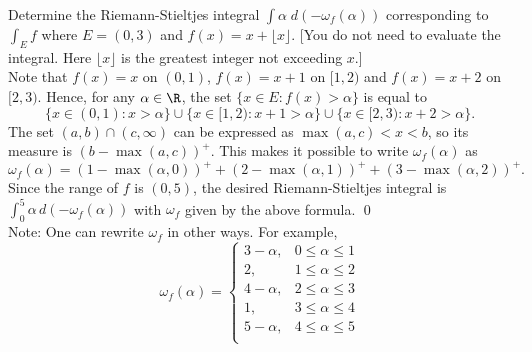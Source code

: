 \begin{hwsol}
Determine the Riemann-Stieltjes integral $\int \alpha \; d(-\omega_f(\alpha))$ corresponding to $\int_E f$ where $E= (0, 3)$ and $f(x)= x + \lfloor x \rfloor $. [You do not need to evaluate the integral. Here $\lfloor x \rfloor$ is the greatest integer not exceeding $x$.] \\

\pf Note that $f(x)=x$ on $(0, 1)$, $f(x)=x+1$ on $[1, 2)$ and $f(x)=x+2$ on $[2, 3)$. Hence, for any $\alpha \in \R$, the set $\{ x \in E \colon f(x) > \alpha \}$ is equal to
        \[
        \{ x \in (0, 1) \colon x > \alpha \} \cup \{ x \in [1, 2) \colon x+1 > \alpha \} \cup \{ x \in [2, 3) \colon x+2 > \alpha \}.
        \]
The set $(a, b) \cap (c,\infty)$ can be expressed as $\max(a, c) < x < b$, so its measure is $(b - \max(a, c))^+$. This makes it possible to write $\omega_f(\alpha)$ as
        \[ 
        \omega_f(\alpha)= (1 - \max(\alpha, 0))^+ + (2 - \max(\alpha, 1))^+ + (3 - \max(\alpha, 2))^+.
        \]
Since the range of $f$ is $(0, 5)$, the desired Riemann-Stieltjes integral is  $\int_0^5  \alpha\,d(-\omega_f(\alpha))$ with $\omega_f$ given by the above formula. \qed \\
 
\noindent Note: One can rewrite $\omega_f$ in other ways. For example,
        \[
        \omega_f(\alpha) = 
        \begin{cases}
        3 - \alpha, & 0 \leq \alpha \leq 1 \\ 
        2, & 1 \leq \alpha \leq 2 \\ 
        4 - \alpha, & 2 \leq \alpha \leq 3 \\ 
        1, & 3 \leq \alpha \leq 4 \\ 
        5 - \alpha, & 4 \leq \alpha \leq 5  \\ 
        \end{cases}
        \] \\
\end{hwsol}


